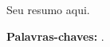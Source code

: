 \begin{resumo}
Seu resumo aqui.

\textbf{Palavras-chaves:} \imprimirpalavraschavesresumo.
\end{resumo}